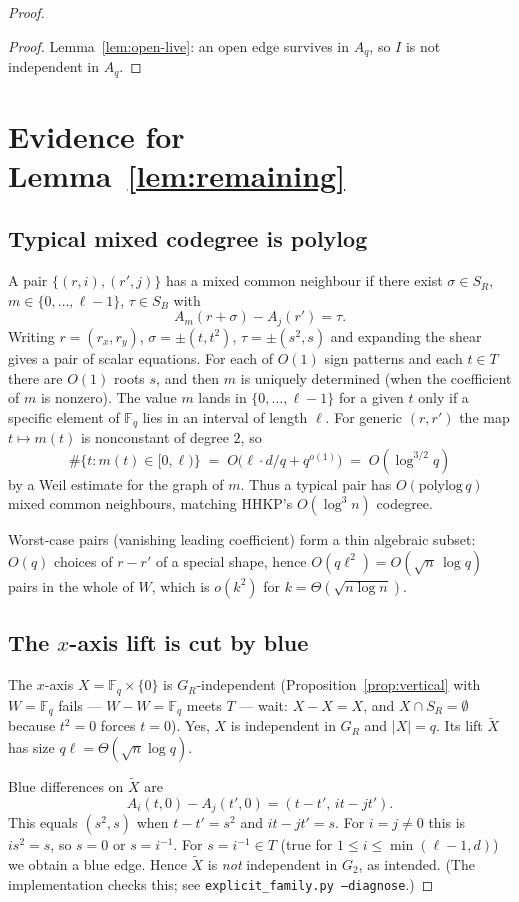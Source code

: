 \documentclass[11pt]{article}
\theoremstyle{definition}
\newcommand{\F}{\mathbb{F}}
\begin{document}
\begin{proof}
\begin{proof}
Lemma~\ref{lem:open-live}: an open edge survives in $A_q$, so $I$ is not independent in $A_q$.
\end{proof}

\section{Evidence for Lemma~\ref{lem:remaining}}

\subsection{Typical mixed codegree is polylog}

A pair $\{(r,i),(r',j)\}$ has a mixed common neighbour if there exist $\sigma\in S_R$, $m\in\{0,\dots,\ell-1\}$, $\tau\in S_B$ with
\[
  A_m(r+\sigma)-A_j(r')=\tau.
\]
Writing $r=(r_x,r_y)$, $\sigma=\pm(t,t^{2})$, $\tau=\pm(s^{2},s)$ and expanding the shear gives a pair of scalar equations.
For each of $O(1)$ sign patterns and each $t\in T$ there are $O(1)$ roots $s$, and then $m$ is uniquely determined (when the coefficient of $m$ is nonzero).
The value $m$ lands in $\{0,\dots,\ell-1\}$ for a given $t$ only if a specific element of $\F_q$ lies in an interval of length $\ell$.
For generic $(r,r')$ the map $t\mapsto m(t)$ is nonconstant of degree $2$, so
\[
  \#\{t:m(t)\in[0,\ell)\}
  \;=\;
  O\bigl(\ell\cdot d/q+q^{o(1)}\bigr)
  \;=\;
  O(\log^{3/2}q)
\]
by a Weil estimate for the graph of $m$.
Thus a typical pair has $O(\mathrm{polylog}\,q)$ mixed common neighbours, matching HHKP's $O(\log^{3}n)$ codegree.

Worst-case pairs (vanishing leading coefficient) form a thin algebraic subset: $O(q)$ choices of $r-r'$ of a special shape, hence $O(q\ell^{2})=O(\sqrt{n}\,\log q)$ pairs in the whole of $W$, which is $o(k^{2})$ for $k=\Theta(\sqrt{n\log n})$.

\subsection{The $x$-axis lift is cut by blue}

The $x$-axis $X=\F_q\times\{0\}$ is $G_R$-independent (Proposition~\ref{prop:vertical} with $W=\F_q$ fails --- $W-W=\F_q$ meets $T$ --- wait: $X-X=X$, and $X\cap S_R=\emptyset$ because $t^{2}=0$ forces $t=0$).
Yes, $X$ is independent in $G_R$ and $|X|=q$.
Its lift $\widetilde X$ has size $q\ell=\Theta(\sqrt{n}\log q)$.

Blue differences on $\widetilde X$ are
\[
  A_i(t,0)-A_j(t',0)=(t-t',\,it-jt').
\]
This equals $(s^{2},s)$ when $t-t'=s^{2}$ and $it-jt'=s$.
For $i=j\ne 0$ this is $i s^{2}=s$, so $s=0$ or $s=i^{-1}$.
For $s=i^{-1}\in T$ (true for $1\le i\le\min(\ell-1,d)$) we obtain a blue edge.
Hence $\widetilde X$ is \emph{not} independent in $G_2$, as intended.
(The implementation checks this; see \texttt{explicit\_family.py --diagnose}.)


\end{proof}
\end{document}
